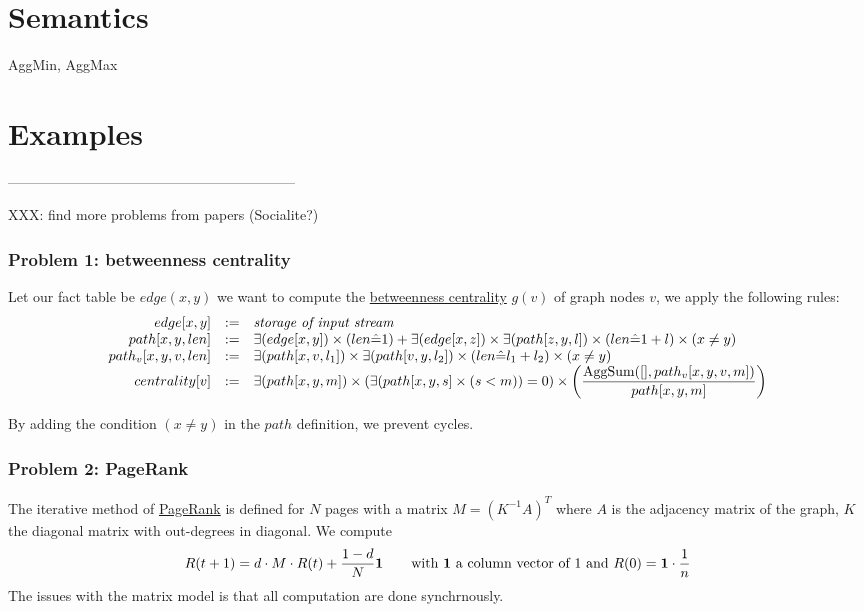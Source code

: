 \documentclass[11pt]{article}
\begin{document}
\section*{Semantics}
AggMin, AggMax

\section*{Examples}





--------------------------------------------------------------

XXX: find more problems from papers (Socialite?)

\subsubsection*{Problem 1: betweenness centrality}
Let our fact table be $edge(x,y)$ we want to compute the \href{http://en.wikipedia.org/wiki/Betweenness_centrality}{betweenness centrality} $g(v)$ of graph nodes $v$, we apply the following rules:
\[\begin{array}{rcl}
edge[x,y] & := & \text{\it storage of input stream} \\
path[x,y,len] & := & \exists(edge[x,y]) \times (len\hat= 1) +  \exists(edge[x,z]) \times \exists(path[z,y,l]) \times (len\hat= 1+l) \times (x\ne y)\\
path_v[x,y,v,len] & := & \exists(path[x,v,l_1]) \times \exists(path[v,y,l_2]) \times (len\hat= l_1+l_2) \times (x\ne y) \\
centrality[v] & := & \exists(path[x,y,m]) \times (\exists(path[x,y,s] \times (s<m)) = 0) \times \left(\dfrac{{\rm AggSum}([], path_v[x,y,v,m])}{path[x,y,m]}\right)
\end{array}\]

By adding the condition $(x\ne y )$ in the $path$ definition, we prevent cycles.

\subsubsection*{Problem 2: PageRank}
The iterative method of \href{http://en.wikipedia.org/wiki/PageRank#Iterative}{PageRank} is defined for $N$ pages with a matrix $M=(K^{-1} A)^T$ where $A$ is the adjacency matrix of the graph, $K$ the diagonal matrix with out-degrees in diagonal. We compute \[R(t+1)=d\cdot M\cdot R(t)+\dfrac{1-d}{N}{\bf 1} \qquad \text{with {\bf 1} a column vector of 1 and }R(0)={\bf 1}\cdot \frac{1}{n}\]
The issues with the matrix model is that all computation are done synchrnously.
\end{document}
